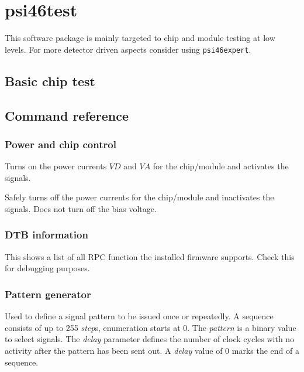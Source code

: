 \chapter{psi46test}

This software package is mainly targeted to chip and module testing at low levels. For more detector driven aspects consider using \texttt{psi46expert}.

\section{Basic chip test}

\section{Command reference}

\subsection{Power and chip control}
\begin{description}

    Turns on the power currents $VD$ and $VA$ for the chip/module and activates the signals.

    Safely turns off the power currents for the chip/module and inactivates the signals. Does not turn off the bias voltage.

\end{description}

\subsection{DTB information}
\begin{description}

    This shows a list of all RPC function the installed firmware supports. Check this for debugging purposes.
\end{description}

\subsection{Pattern generator}
\begin{description}

    Used to define a signal pattern to be issued once or repeatedly. A sequence consists of up to 255 \emph{step}s, enumeration starts at 0. The \emph{pattern} is a binary value to select signals. The \emph{delay} parameter defines the number of clock cycles with no activity after the pattern has been sent out. A \emph{delay} value of 0 marks the end of a sequence.
\end{description}

